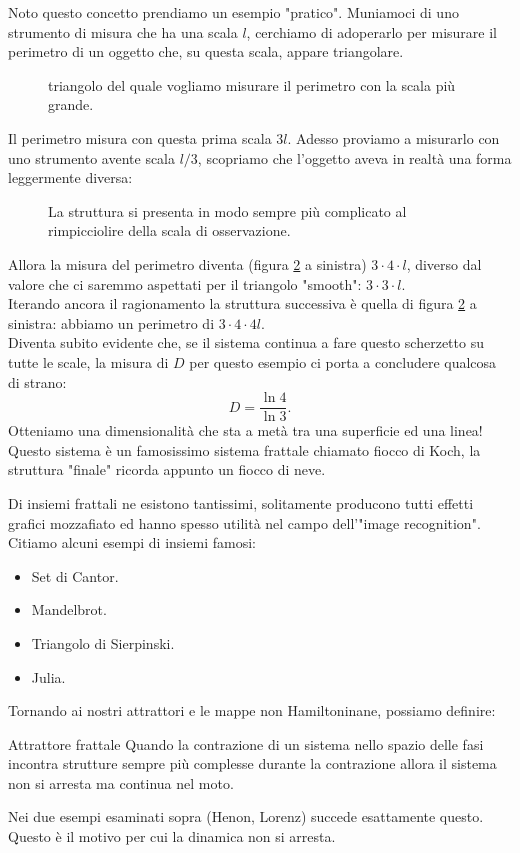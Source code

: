\begin{exmp}    
Noto questo concetto prendiamo un esempio "pratico". Muniamoci di uno strumento di misura che ha una scala $l$, cerchiamo di adoperarlo per misurare il perimetro di un oggetto che, su questa scala, appare triangolare.
\begin{figure}[H]
    \centering
    \caption{\scriptsize triangolo del quale vogliamo misurare il perimetro con la scala più grande.}
    \label{fig:22_triangolo}
\end{figure}
\noindent
Il perimetro misura con questa prima scala $3l$. 
Adesso proviamo a misurarlo con uno strumento avente scala $l /3$, scopriamo che l'oggetto aveva in realtà una forma leggermente diversa:
\begin{figure}[H]
    \centering
    \caption{\scriptsize La struttura si presenta in modo sempre più complicato al rimpicciolire della scala di osservazione.}
    \label{fig:22_koch}
\end{figure}
\noindent
Allora la misura del perimetro diventa (figura \ref{fig:22_koch} a sinistra) $3\cdot 4\cdot l$, diverso dal valore che ci saremmo aspettati per il triangolo "smooth": $3\cdot 3\cdot l$.\\
Iterando ancora il ragionamento la struttura successiva è quella di figura \ref{fig:22_koch} a sinistra: abbiamo un perimetro di $3 \cdot 4\cdot 4 l$.\\
Diventa subito evidente che, se il sistema continua a fare questo scherzetto su tutte le scale, la misura di $D$ per questo esempio ci porta a concludere qualcosa di strano:
\[
    D = \frac{\ln 4}{\ln 3}
.\] 
Otteniamo una dimensionalità che sta a metà tra una superficie ed una linea!\\
Questo sistema è un famosissimo sistema frattale chiamato fiocco di Koch, la struttura "finale" ricorda appunto un fiocco di neve.
\end{exmp}
\noindent
Di insiemi frattali ne esistono tantissimi, solitamente producono tutti effetti grafici mozzafiato ed hanno spesso utilità nel campo dell'"image recognition".\\
Citiamo alcuni esempi di insiemi famosi:
\begin{itemize}
    \item Set di Cantor.
    \item Mandelbrot.
    \item Triangolo di Sierpinski.
    \item Julia.
\end{itemize}
Tornando ai nostri attrattori e le mappe non Hamiltoninane, possiamo definire:
\begin{greenbox}{Attrattore frattale}
    Quando la contrazione di un sistema nello spazio delle fasi incontra strutture sempre più complesse durante la contrazione allora il sistema non si arresta ma continua nel moto.
\end{greenbox}
\noindent
Nei due esempi esaminati sopra (Henon, Lorenz) succede esattamente questo. Questo è il motivo per cui la dinamica non si arresta.
